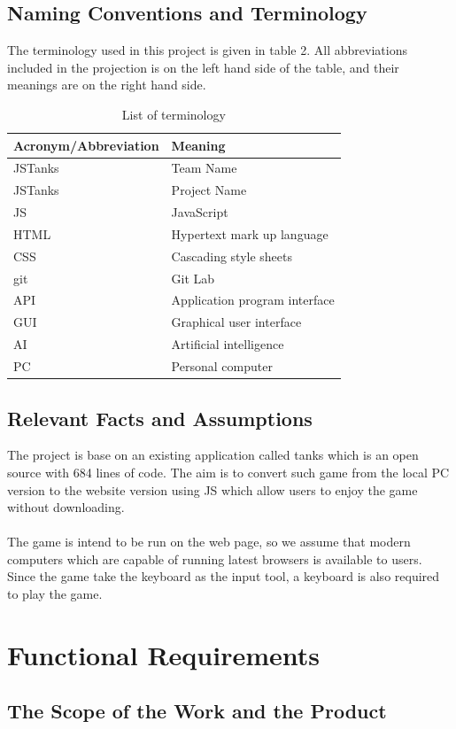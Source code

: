 \documentclass[12pt, titlepage]{article}
\begin{document}
\subsection{Naming Conventions and Terminology}
The terminology used in this project is given in table 2.  All abbreviations included in
the projection is on the left hand side of the table, and their meanings are on the right
hand side.
\begin{table}[h]
\caption{List of terminology} \label{tab:terminology}
\begin{tabular}{ | l | l |}
\hline
Acronym/Abbreviation  & Meaning\\\hline
JSTanks & Team Name\\\hline
JSTanks & Project Name\\\hline
JS & JavaScript\\\hline
HTML & Hypertext mark up language\\\hline
CSS & Cascading style sheets\\\hline
git & Git Lab\\\hline
API & Application program interface\\\hline
GUI & Graphical user interface\\\hline
AI & Artificial intelligence\\\hline
PC & Personal computer\\\hline
\end{tabular}
\end{table}
\subsection{Relevant Facts and Assumptions}
The project is base on an existing
application called tanks which is an open source with 684 lines of code. The aim
is to convert such game from the local PC version to the website version using
JS which allow users to enjoy the game without downloading.\\\\ The game is
intend to be run on the web page, so we assume that modern computers which are
capable of running latest browsers is available to users. Since the game take
the keyboard as the input tool, a keyboard is also required to play the game.
\section{Functional Requirements}
\subsection{The Scope of the Work and the Product}
\end{document}
